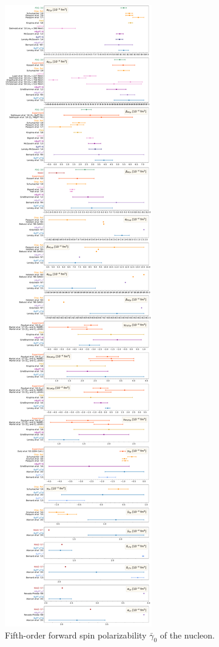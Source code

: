 \documentclass[preprints,review,accept,moreauthors,pdftex]{Definitions/mdpi}
\def\ga{\gamma} \def\Ga{{\it\Gamma}}
\begin{document}
\begin{figure}[t]
\centering
\includegraphics[width=\columnwidth]{Figures/BarGamma0Pol.pdf}
\caption{Fifth-order forward spin polarizability $\bar \ga_0$ of the nucleon. \label{BarGamma0Pol}}
\end{figure}
\end{document}
